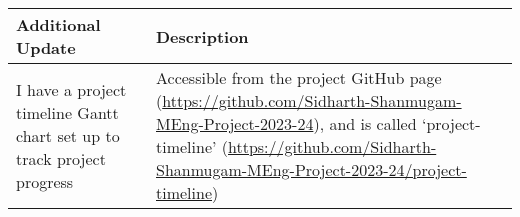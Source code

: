 \begin{table}[!h]
    \centering
    \begin{tabularx}{\textwidth}{|l|X|}
        \hline
        Additional Update & Description \\
        \hline
        \hline
        I have a project timeline Gantt chart set up to track project progress & 
        Accessible from the project GitHub page (\url{https://github.com/Sidharth-Shanmugam-MEng-Project-2023-24}), and is called `project-timeline' (\url{https://github.com/Sidharth-Shanmugam-MEng-Project-2023-24/project-timeline}) \\
        \hline
    \end{tabularx}
\end{table}
